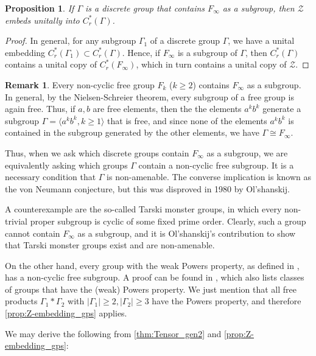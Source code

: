 \documentclass{amsart}
\newtheorem{prop}[propCt]{Proposition}
\theoremstyle{definition}
\newtheorem{rmk}[rmkCt]{Remark}
\begin{document}
\begin{prop}
\label{prop:Z-embedding_gps}
       If $\Gamma$ is a discrete group that contains $F_\infty$ as a subgroup, then $\mathcal{Z}$ embeds unitally into $C^*_r(\Gamma)$.
\end{prop}
\begin{proof}
    In general, for any subgroup $\Gamma_1$ of a discrete group $\Gamma$, we have a unital embedding $C^*_r(\Gamma_1)\subset C^*_r(\Gamma)$.
    Hence, if $F_\infty$ is a subgroup of $\Gamma$, then $C^*_r(\Gamma)$ contains a unital copy of $C^*_r(F_\infty)$, which in turn contains a unital copy of $\mathcal{Z}$.
\end{proof}

\begin{rmk}
\label{pargr:gps_with_free_subgp}
    Every non-cyclic free group $F_k$ ($k\geq 2$) contains $F_\infty$ as a subgroup.
    In general, by the Nielsen-Schreier theorem, every subgroup of a free group is again free.
    Thus, if $a,b$ are free elements, then the the elements $a^kb^k$ generate a subgroup $\Gamma=\langle a^kb^k, k\geq 1\rangle$ that is free, and since none of the elements $a^kb^k$ is contained in the subgroup generated by the other elements, we have $\Gamma\cong F_\infty$.

    Thus, when we ask which discrete groups contain $F_\infty$ as a subgroup, we are equivalently asking which groups $\Gamma$ contain a non-cyclic free subgroup.
    It is a necessary condition that $\Gamma$ is non-amenable.
    The converse implication is known as the von Neumann conjecture, but this  was disproved in 1980 by Ol'shanskij.

    A counterexample are the so-called Tarski monster groups, in which every non-trivial proper subgroup is cyclic of some fixed prime order.
    Clearly, such a group cannot contain $F_\infty$ as a subgroup, and it is Ol'shanskij's contribution to show that Tarski monster groups exist and are non-amenable.

    On the other hand, every group with the weak Powers property, as defined in \cite{BocNic1988}, has a non-cyclic free subgroup.
    A proof can be found in \cite{dlH2007}, which also lists classes of groups that have the (weak) Powers property.
    We just mention that all free products $\Gamma_1\ast \Gamma_2$ with $|\Gamma_1|\geq 2, |\Gamma_2|\geq 3$ have the Powers property, and therefore \autoref{prop:Z-embedding_gps} applies.

    We may derive the following from \autoref{thm:Tensor_gen2} and \autoref{prop:Z-embedding_gps}:
\end{rmk}
\end{document}
